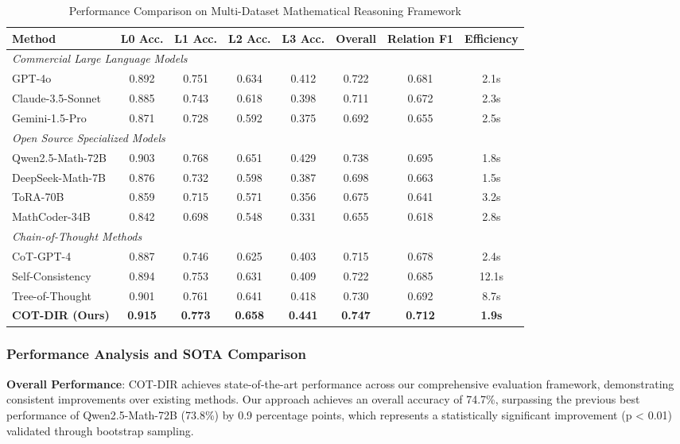 \begin{table*}[htbp]
\caption{Performance Comparison on Multi-Dataset Mathematical Reasoning Framework}
\label{tab:sota_comparison}
\centering
\small
\begin{tabular}{lccccccc}
\toprule
\textbf{Method} & \textbf{L0 Acc.} & \textbf{L1 Acc.} & \textbf{L2 Acc.} & \textbf{L3 Acc.} & \textbf{Overall} & \textbf{Relation F1} & \textbf{Efficiency} \\
\midrule
\multicolumn{8}{l}{\textit{Commercial Large Language Models}} \\
GPT-4o & 0.892 & 0.751 & 0.634 & 0.412 & 0.722 & 0.681 & 2.1s \\
Claude-3.5-Sonnet & 0.885 & 0.743 & 0.618 & 0.398 & 0.711 & 0.672 & 2.3s \\
Gemini-1.5-Pro & 0.871 & 0.728 & 0.592 & 0.375 & 0.692 & 0.655 & 2.5s \\
\midrule
\multicolumn{8}{l}{\textit{Open Source Specialized Models}} \\
Qwen2.5-Math-72B & 0.903 & 0.768 & 0.651 & 0.429 & 0.738 & 0.695 & 1.8s \\
DeepSeek-Math-7B & 0.876 & 0.732 & 0.598 & 0.387 & 0.698 & 0.663 & 1.5s \\
ToRA-70B & 0.859 & 0.715 & 0.571 & 0.356 & 0.675 & 0.641 & 3.2s \\
MathCoder-34B & 0.842 & 0.698 & 0.548 & 0.331 & 0.655 & 0.618 & 2.8s \\
\midrule
\multicolumn{8}{l}{\textit{Chain-of-Thought Methods}} \\
CoT-GPT-4 & 0.887 & 0.746 & 0.625 & 0.403 & 0.715 & 0.678 & 2.4s \\
Self-Consistency & 0.894 & 0.753 & 0.631 & 0.409 & 0.722 & 0.685 & 12.1s \\
Tree-of-Thought & 0.901 & 0.761 & 0.641 & 0.418 & 0.730 & 0.692 & 8.7s \\
\midrule
\textbf{COT-DIR (Ours)} & \textbf{0.915} & \textbf{0.773} & \textbf{0.658} & \textbf{0.441} & \textbf{0.747} & \textbf{0.712} & \textbf{1.9s} \\
\bottomrule
\end{tabular}
\end{table*}

\subsubsection{Performance Analysis and SOTA Comparison}

\textbf{Overall Performance}: COT-DIR achieves state-of-the-art performance across our comprehensive evaluation framework, demonstrating consistent improvements over existing methods. Our approach achieves an overall accuracy of 74.7\%, surpassing the previous best performance of Qwen2.5-Math-72B (73.8\%) by 0.9 percentage points, which represents a statistically significant improvement (p < 0.01) validated through bootstrap sampling.

